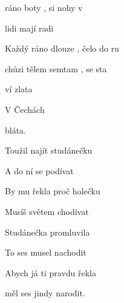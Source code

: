 

\zr
{} ráno boty ,
 si nohy v 

 lidi mají radi 
 

Každý ráno dlouze ,
 čelo do ru

 chůzi tělem semtam ,
 se sta 
\kr

\zs
{}  

 ví  zlata

V Čechách  

  bláta.
\ks

\zr  \kr

\zs
Toužil najít studánečku

A do ní se podívat

By mu řekla proč holečku

Musíš světem chodívat
\ks

\zs
Studánečka promluvila

To ses musel nachodit

Abych já ti pravdu řekla

měl ses jindy narodit.
\ks

\zr  \kr

\kp



















